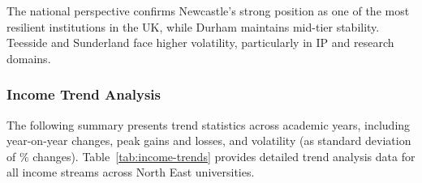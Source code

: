 \documentclass[journal,onecolumn, 10pt,draftclsnofoot]{IEEEtran}
\begin{document}
The national perspective confirms Newcastle's strong position as one of the most resilient institutions in the UK, while Durham maintains mid-tier stability. Teesside and Sunderland face higher volatility, particularly in IP and research domains.

\subsubsection{Income Trend Analysis}

The following summary presents trend statistics across academic years, including year-on-year changes, peak gains and losses, and volatility (as standard deviation of \% changes). Table~\ref{tab:income-trends} provides detailed trend analysis data for all income streams across North East universities.
\vspace{0.3cm}
\end{document}
